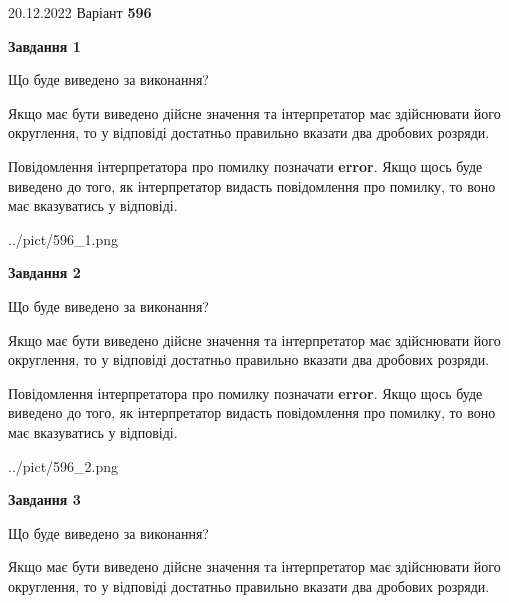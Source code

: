 \documentclass[12pt, ukrainian]{article}
\begin{document}
{20.12.2022 Варіант \No \textbf { 596 }\par}
{
\begin {Large}

{\begin {center}\textbf{Завдання 1}\end {center}}\par
Що буде виведено за виконання? \par

Якщо має бути виведено дійсне значення та інтерпретатор має здійснювати його округлення, 
то у відповіді достатньо правильно вказати два дробових розряди.

Повідомлення інтерпретатора про помилку позначати \textbf{error}.
Якщо щось буде виведено до того, як інтерпретатор видасть повідомлення про помилку, 
то воно має вказуватись у відповіді. \par

\begin{center}
	{../pict/596_1.png}
\end{center}
\newpage

{\begin {center}\textbf{Завдання 2}\end {center}}\par
Що буде виведено за виконання? \par

Якщо має бути виведено дійсне значення та інтерпретатор має здійснювати його округлення, 
то у відповіді достатньо правильно вказати два дробових розряди.

Повідомлення інтерпретатора про помилку позначати \textbf{error}.
Якщо щось буде виведено до того, як інтерпретатор видасть повідомлення про помилку, 
то воно має вказуватись у відповіді. \par

\begin{center}
	{../pict/596_2.png}
\end{center}
\newpage

{\begin {center}\textbf{Завдання 3}\end {center}}\par
Що буде виведено за виконання? \par

Якщо має бути виведено дійсне значення та інтерпретатор має здійснювати його округлення, 
то у відповіді достатньо правильно вказати два дробових розряди.


\end{Large}}
\end{document}
